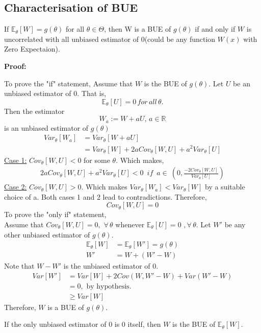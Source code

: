 \documentclass[12pt,a4paper]{article}
\begin{document}
\subsection{Characterisation of BUE}
\begin{thm}
If $\mathbb{E}_\theta[W]=g(\theta)$ for all $\theta\in\Theta$, then W is a BUE of $g(\theta)$ if and only if $W$  is uncorrelated with all unbiased estimator of $0$(could be any function $W(x)$ with Zero Expectaion).
\end{thm} 
\begin{flushleft}
\textbf{Proof:}
\end{flushleft}
To prove the "if" statement,
Assume that $W$ is the BUE of $g(\theta)$.
Let $U$ be an unbiased estimator of 0. That is, $$\mathbb{E}_\theta[U]=0 \,for\, all\, \theta.$$
Then the estimator $$W_a:=W+aU,\,a\in\mathbb{R}$$ is an unbiased estimator of $g(\theta)$
\begin{align}
\nonumber
Var_\theta[W_a]&=Var_\theta[W+aU]\\
&=Var_\theta[W]+2aCov_\theta[W,U]+a^2Var_\theta[U]
\end{align}
\underline{Case 1:} $Cov_\theta[W,U]<0$ for some $\theta$.
Which makes, 
\begin{align}
2aCov_\theta[W,U]+a^2Var_\theta[U]<0 \, \, \,if\, \, \, a\in\ \left(0,\frac{-2Cov_\theta[W,U]}{Var_\theta[U]} \right)
\end{align}
\underline{Case 2:} $Cov_\theta[W,U]>0.$
Which makes $Var_\theta[W_a]<Var_\theta[W]$ by a suitable choice of a.
Both cases 1 and 2 lead to contradictions. Therefore, $$Cov_\theta[W,U]=0$$
To prove the "only if" statement,\\
Assume that $ Cov_\theta[W,U]=0, \,\,\forall \,\theta$ whenever $\mathbb{E}_\theta[U]=0\,\, , \forall \,\theta$.
Let $W'$ be any other unbiased estimator of $g(\theta)$.
\begin{align*}
\mathbb{E}_\theta[W]&=\mathbb{E}_\theta[W']=g(\theta)\\
W'&=W+(W'-W)
\end{align*}
Note that $W-W'$ is the unbiased estimator of 0.
\begin{align*}
Var[W']&=Var[W]+2Cov(W,W'-W)+Var(W'-W)\\
&=0, \,\, \textrm{by hypothesis.}\\
&\geq Var[W]
\end{align*}
Therefore, $W$ is a BUE of $g(\theta)$.\\
\begin{cor} 
If the only unbiased estimator of 0 is 0 itself, then $W$ is the BUE of $\mathbb{E}_\theta[W]$.\\
\end{cor}
\end{document}
